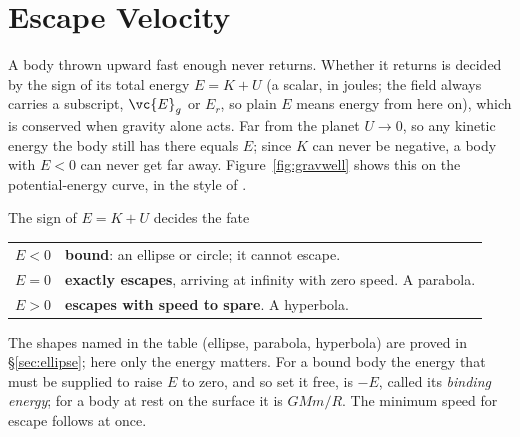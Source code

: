 \section{Escape Velocity}\label{sec:escape}

A body thrown upward fast enough never returns. Whether it returns is decided by the sign of its total
energy $E=K+U$ (a scalar, in joules; the field always carries a subscript, $\vc{E}_g$ or $E_r$, so plain
$E$ means energy from here on), which is conserved when gravity alone acts. Far from the planet $U\to0$, so any kinetic
energy the body still has there equals $E$; since $K$ can never be negative, a body with $E<0$ can never
get far away. Figure~\ref{fig:gravwell} shows this on the potential-energy curve, in the style of
.

\begin{keybox}{The sign of $E=K+U$ decides the fate}
\centering
\begin{tabular}{@{}cl@{}}
\toprule
$E<0$ & \textbf{bound}: an ellipse or circle; it cannot escape.\\
$E=0$ & \textbf{exactly escapes}, arriving at infinity with zero speed. A parabola.\\
$E>0$ & \textbf{escapes with speed to spare}. A hyperbola.\\
\bottomrule
\end{tabular}
\end{keybox}

\begin{figure}[htbp]
\centering
{}
\end{figure}

The shapes named in the table (ellipse, parabola, hyperbola) are proved in \S\ref{sec:ellipse}; here only
the energy matters. For a bound body the energy that must be supplied to raise $E$ to zero, and so set it
free, is $-E$, called its \emph{binding energy}; for a body at rest on the surface it is $GMm/R$. The
minimum speed for escape follows at once.

